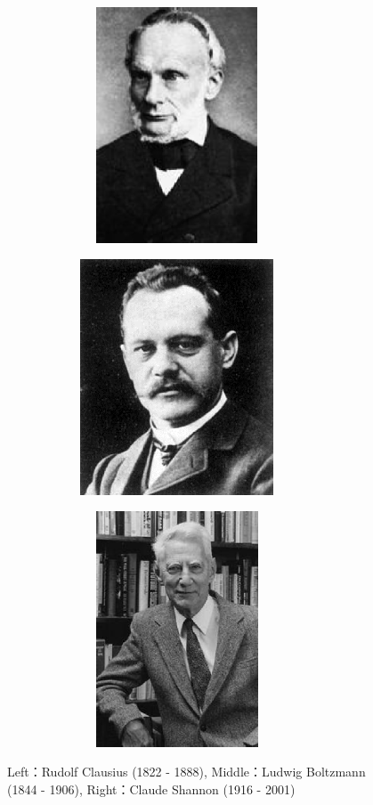 \begin{figure}[htbp]
\begin{minipage}[h]{0.33\linewidth}
\centering
  \includegraphics[width=0.9\textwidth, height=7cm]{figures/scientists/RudolfClausius.eps}
  \label{fig:RudolfClausius}
\end{minipage}
\begin{minipage}[h]{0.33\linewidth}
\centering
  \includegraphics[width=0.9\textwidth, height=7cm]{figures/scientists/LudwigBoltzmann.eps}
  \label{fig:LudwigBoltzmann}
\end{minipage}
\begin{minipage}[h]{0.33\linewidth}
\centering
  \includegraphics[width=0.9\textwidth, height=7cm]{figures/scientists/claudeshannon.eps}
  \label{fig:claudeshannon}
\end{minipage}
\caption{Left：Rudolf Clausius (1822 - 1888), Middle：Ludwig Boltzmann (1844 - 1906), Right：Claude Shannon (1916 - 2001)}
\end{figure}

